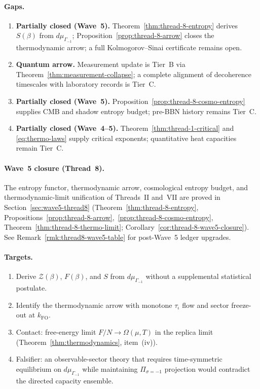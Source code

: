 \paragraph{Gaps.}
\begin{enumerate}[label=(\roman*),leftmargin=*]
  \item \textbf{Partially closed (Wave~5).}
    Theorem~\ref{thm:thread-8-entropy} derives $S(\beta)$ from
    $d\mu_{\Gamma_{-1}}$; Proposition~\ref{prop:thread-8-arrow} closes the
    thermodynamic arrow; a full Kolmogorov--Sinai certificate remains open.
  \item \textbf{Quantum arrow.} Measurement update is Tier~B via
    Theorem~\ref{thm:measurement-collapse}; a complete alignment of
    decoherence timescales with laboratory records is Tier~C.
  \item \textbf{Partially closed (Wave~5).}
    Proposition~\ref{prop:thread-8-cosmo-entropy} supplies CMB and shadow
    entropy budget; pre-BBN history remains Tier~C.
  \item \textbf{Partially closed (Wave~4--5).}
    Theorem~\ref{thm:thread-1-critical} and \eqref{eq:thermo-laws} supply
    critical exponents; quantitative heat capacities remain Tier~C.
\end{enumerate}

\paragraph{Wave~5 closure (Thread~8).}
The entropy functor, thermodynamic arrow, cosmological entropy budget, and
thermodynamic-limit unification of Threads~II and~VII are proved in
Section~\ref{sec:wave5-thread8}
(Theorem~\ref{thm:thread-8-entropy},
Propositions~\ref{prop:thread-8-arrow},~\ref{prop:thread-8-cosmo-entropy},
Theorem~\ref{thm:thread-8-thermo-limit};
Corollary~\ref{cor:thread-8-wave5-closure}).
See Remark~\ref{rmk:thread8-wave5-table} for post-Wave~5 ledger upgrades.

\paragraph{Targets.}
\begin{enumerate}[label=(\roman*),leftmargin=*]
  \item Derive $\mathcal{Z}(\beta)$, $F(\beta)$, and $S$ from $d\mu_{\Gamma_{-1}}$
    without a supplemental statistical postulate.
  \item Identify the thermodynamic arrow with monotone $\tau_\iota$ flow and
    sector freeze-out at $k_{\mathrm{FO}}$.
  \item Contact: free-energy limit $F/N\to\Omega(\mu,T)$ in the replica limit
    (Theorem~\ref{thm:thermodynamics}, item~(iv)).
  \item Falsifier: an observable-sector theory that requires time-symmetric
    equilibrium on $d\mu_{\Gamma_{-1}}$ while maintaining
    $\Pi_{\sigma=-1}$ projection would contradict the directed capacity
    ensemble.
\end{enumerate}

